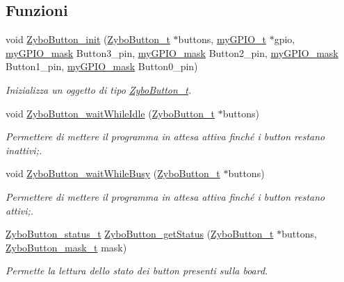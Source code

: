 \subsection*{Funzioni}
\begin{DoxyCompactItemize}
\item 
void \hyperlink{group___button_gac5362bbb2d8845e2403e9cbe18cf3834}{Zybo\+Button\+\_\+init} (\hyperlink{struct_zybo_button__t}{Zybo\+Button\+\_\+t} $\ast$buttons, \hyperlink{structmy_g_p_i_o__t}{my\+G\+P\+I\+O\+\_\+t} $\ast$gpio, \hyperlink{group__bare-metal_ga402a0d20afc0cb7c25554b8b023f4253}{my\+G\+P\+I\+O\+\_\+mask} Button3\+\_\+pin, \hyperlink{group__bare-metal_ga402a0d20afc0cb7c25554b8b023f4253}{my\+G\+P\+I\+O\+\_\+mask} Button2\+\_\+pin, \hyperlink{group__bare-metal_ga402a0d20afc0cb7c25554b8b023f4253}{my\+G\+P\+I\+O\+\_\+mask} Button1\+\_\+pin, \hyperlink{group__bare-metal_ga402a0d20afc0cb7c25554b8b023f4253}{my\+G\+P\+I\+O\+\_\+mask} Button0\+\_\+pin)
\begin{DoxyCompactList}\small\item\em Inizializza un oggetto di tipo \hyperlink{struct_zybo_button__t}{Zybo\+Button\+\_\+t}. \end{DoxyCompactList}\item 
void \hyperlink{group___button_gaca30e81084e746785e395f79e9678e9a}{Zybo\+Button\+\_\+wait\+While\+Idle} (\hyperlink{struct_zybo_button__t}{Zybo\+Button\+\_\+t} $\ast$buttons)
\begin{DoxyCompactList}\small\item\em Permettere di mettere il programma in attesa attiva finché i button restano inattivi;. \end{DoxyCompactList}\item 
void \hyperlink{group___button_ga3840edf011b5bad6302b7efc9c6326fe}{Zybo\+Button\+\_\+wait\+While\+Busy} (\hyperlink{struct_zybo_button__t}{Zybo\+Button\+\_\+t} $\ast$buttons)
\begin{DoxyCompactList}\small\item\em Permettere di mettere il programma in attesa attiva finché i button restano attivi;. \end{DoxyCompactList}\item 
\hyperlink{group___button_ga85c290bfa232cab213e69200bf78e06a}{Zybo\+Button\+\_\+status\+\_\+t} \hyperlink{group___button_ga75407539e8ba0ad3ea142496219cd083}{Zybo\+Button\+\_\+get\+Status} (\hyperlink{struct_zybo_button__t}{Zybo\+Button\+\_\+t} $\ast$buttons, \hyperlink{group___button_ga4d26a5f6cad606de534ba034e0ba42dd}{Zybo\+Button\+\_\+mask\+\_\+t} mask)
\begin{DoxyCompactList}\small\item\em Permette la lettura dello stato dei button presenti sulla board. \end{DoxyCompactList}\end{DoxyCompactItemize}


